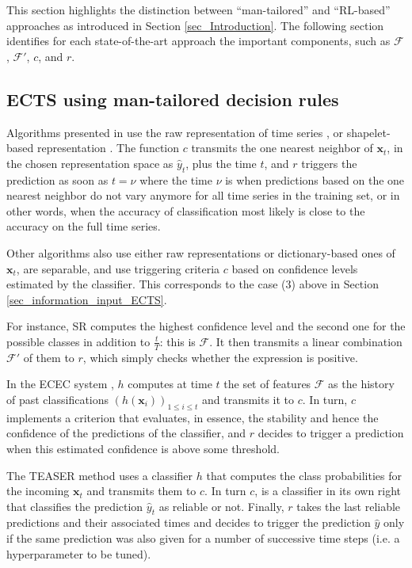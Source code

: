 \documentclass[sigconf, nonacm, table]{acmart}
\begin{document}
This section highlights the distinction between ``man-tailored''  and ``RL-based'' approaches as introduced in Section \ref{sec_Introduction}. 
The following section identifies for each state-of-the-art approach the important components, such as $\mathcal{F}$, $\mathcal{F}'$, $c$, and $r$.







\subsection{ECTS using man-tailored decision rules}\label{man_tailored}

Algorithms presented in  \cite{xing2009early, xing2011extracting, xing2012early} use the raw representation of time series \cite{xing2009early}, or shapelet-based representation \cite{xing2011extracting, xing2012early}. The function $c$ transmits the one nearest neighbor of $\mathbf{x}_t$, in the chosen representation space as $\hat{y}_t$, plus the time $t$, and $r$ triggers the prediction as soon as $t = \nu$ where the time $\nu$ is when predictions based on the one nearest neighbor do not vary anymore for all time series in the training set, or in other words, when the accuracy of classification most likely is close to the accuracy on the full time series. 


Other algorithms also use either raw representations or dictionary-based ones of $\mathbf{x}_t$, are separable, and use triggering criteria $c$ based on confidence levels estimated by the classifier. This corresponds to the case (3) above in Section \ref{sec_information_input_ECTS}. 


For instance, SR \cite{mori2017early} computes the highest confidence level and the second one for the possible classes in addition to $\frac{t}{T}$: this is $\mathcal{F}$. It then transmits a linear combination $\mathcal{F}'$  of them to $r$, which simply checks whether the expression is positive.

In the ECEC system \cite{lv2019effective}, $h$ computes at time $t$ the set of features $\mathcal{F}$ as the history of past classifications $(h(\mathbf{x}_i))_{1\leq i \leq t}$ and transmits it to $c$. In turn, $c$ implements a criterion that evaluates, in essence, the stability and hence the confidence of the predictions of the classifier, and $r$ decides to trigger a prediction when this estimated confidence is above some threshold.

The TEASER method \cite{schafer2020teaser} uses a classifier $h$ that computes the class probabilities for the incoming $\mathbf{x}_t$ and transmits them to $c$. In turn $c$, is a classifier in its own right that classifies the prediction $\hat{y}_t$ as reliable or not. Finally, $r$ takes the last reliable predictions and their associated times and decides to trigger the prediction $\hat{y}$ only if the same prediction was also given for a number of successive time steps (i.e. a hyperparameter to be tuned).
\end{document}
